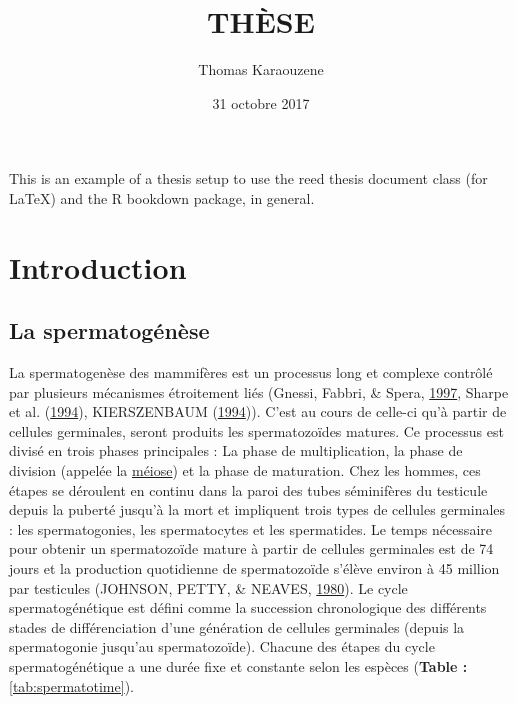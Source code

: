 \documentclass[12pt,twoside]{reedthesis}
\title{THÈSE}
\author{Thomas Karaouzene}
\date{31 octobre 2017}
\theoremstyle{definition}
\theoremstyle{definition}
\theoremstyle{remark}
\begin{document}
      \maketitle
  
  \frontmatter %
  \pagestyle{empty} %

  
      \begin{preface}
      This is an example of a thesis setup to use the reed thesis document
      class (for LaTeX) and the R bookdown package, in general.
    \end{preface}
  
      \hypersetup{linkcolor=black}
    \setcounter{tocdepth}{3}
    \tableofcontents
  
      \listoftables
  
      \listoffigures
  
  
  
  \mainmatter %
  \pagestyle{fancyplain} %

  \chapter{Introduction}\label{introInf}
  
  \section{La spermatogénèse}\label{la-spermatogenese}
  
  La spermatogenèse des mammifères est un processus long et complexe
  contrôlé par plusieurs mécanismes étroitement liés (Gnessi, Fabbri, \&
  Spera, \protect\hyperlink{ref-Gnessi1997}{1997}, Sharpe et al.
  (\protect\hyperlink{ref-Sharpe1994}{1994}), KIERSZENBAUM
  (\protect\hyperlink{ref-KIERSZENBAUM1994}{1994})). C'est au cours de
  celle-ci qu'à partir de cellules germinales, seront produits les
  spermatozoïdes matures. Ce processus est divisé en trois phases
  principales : La phase de multiplication, la phase de division (appelée
  la \protect\hyperlink{meiose}{méiose}) et la phase de maturation. Chez
  les hommes, ces étapes se déroulent en continu dans la paroi des tubes
  séminifères du testicule depuis la puberté jusqu'à la mort et impliquent
  trois types de cellules germinales : les spermatogonies, les
  spermatocytes et les spermatides. Le temps nécessaire pour obtenir un
  spermatozoïde mature à partir de cellules germinales est de 74 jours et
  la production quotidienne de spermatozoïde s'élève environ à 45 million
  par testicules (JOHNSON, PETTY, \& NEAVES,
  \protect\hyperlink{ref-Johnson1980}{1980}). Le cycle spermatogénétique
  est défini comme la succession chronologique des différents stades de
  différenciation d'une génération de cellules germinales (depuis la
  spermatogonie jusqu'au spermatozoïde). Chacune des étapes du cycle
  spermatogénétique a une durée fixe et constante selon les espèces
  (\textbf{Table : }\ref{tab:spermatotime}).
  
\end{document}
